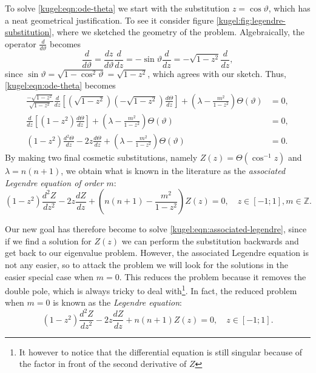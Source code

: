 To solve \eqref{kugel:eqn:ode-theta} we start with the substitution $z = \cos
\vartheta$, which has a neat geometrical justification. To see it consider
figure \ref{kugel:fig:legendre-substitution}, where we sketched the geometry of
the problem. Algebraically, the operator $\frac{d}{d \vartheta}$ becomes
\begin{equation*}
    \frac{d}{d \vartheta}
    = \frac{dz}{d \vartheta}\frac{d}{dz}
    = -\sin \vartheta \frac{d}{dz}
    = -\sqrt{1-z^2} \frac{d}{dz},
\end{equation*} 
since $\sin \vartheta = \sqrt{1 - \cos^2 \vartheta} = \sqrt{1 - z^2}$, which
agrees with our sketch. Thus, \eqref{kugel:eqn:ode-theta} becomes 
\begin{align*}
  \frac{-\sqrt{1-z^2}}{\sqrt{1-z^2}} \frac{d}{dz} \left[
    \left(\sqrt{1-z^2}\right) \left(-\sqrt{1-z^2}\right) \frac{d \Theta}{dz}
  \right]
  + \left( \lambda - \frac{m^2}{1 - z^2} \right)\Theta(\vartheta) &= 0,
  \\
  \frac{d}{dz} \left[ (1-z^2) \frac{d \Theta}{dz} \right]
  + \left( \lambda - \frac{m^2}{1 - z^2} \right)\Theta(\vartheta) &= 0,
  \\
  (1-z^2)\frac{d^2 \Theta}{dz} - 2z\frac{d \Theta}{dz}
  + \left( \lambda - \frac{m^2}{1 - z^2} \right)\Theta(\vartheta) &= 0.
\end{align*}
By making two final cosmetic substitutions, namely $Z(z) = \Theta(\cos^{-1}z)$
and $\lambda = n(n+1)$, we obtain what is known in the literature as the
\emph{associated Legendre equation of order $m$}:
\nocite{olver_introduction_2013}
\begin{equation} \label{kugel:eqn:associated-legendre}
  (1 - z^2)\frac{d^2 Z}{dz^2}
  - 2z\frac{d Z}{dz}
  + \left( n(n + 1) - \frac{m^2}{1 - z^2} \right) Z(z) = 0,
  \quad
  z \in [-1; 1], m \in \mathbb{Z}.
\end{equation}

Our new goal has therefore become to solve
\eqref{kugel:eqn:associated-legendre}, since if we find a solution for $Z(z)$ we
can perform the substitution backwards and get back to our eigenvalue problem.
However, the associated Legendre equation is not any easier, so to attack the
problem we will look for the solutions in the easier special case when $m = 0$.
This reduces the problem because it removes the double pole, which is always
tricky to deal with\footnote{It however to notice that the differential equation
is still singular because of the factor in front of the second derivative of
$Z$}. In fact, the reduced problem when $m = 0$ is known as the \emph{Legendre
equation}:
\begin{equation} \label{kugel:eqn:legendre}
  (1 - z^2)\frac{d^2 Z}{dz^2}
  - 2z\frac{d Z}{dz}
  + n(n + 1) Z(z) = 0,
  \quad
  z \in [-1; 1].
\end{equation}

